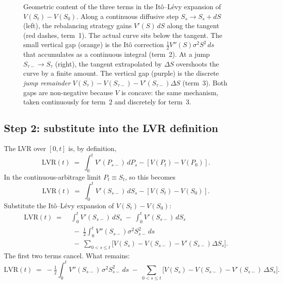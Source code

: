 \documentclass[11pt]{article}
\theoremstyle{definition}
\theoremstyle{remark}
\newcommand{\1}{\mathbf{1}}
\begin{document}
\begin{figure}[h]
\caption{Geometric content of the three terms in the Itô--Lévy expansion of $V(S_t) - V(S_0)$. Along a continuous diffusive step $S_s \to S_s + dS$ (left), the rebalancing strategy gains $V'(S)\,dS$ along the tangent (red dashes, term~1). The actual curve sits below the tangent. The small vertical gap (orange) is the Itô correction $\frac{1}{2}V''(S)\sigma^2 S^2\,ds$ that accumulates as a continuous integral (term~2). At a jump $S_{\tau-} \to S_\tau$ (right), the tangent extrapolated by $\Delta S$ overshoots the curve by a finite amount. The vertical gap (purple) is the discrete \emph{jump remainder} $V(S_\tau) - V(S_{\tau-}) - V'(S_{\tau-})\Delta S$ (term~3). Both gaps are non-negative because $V$ is concave: the same mechanism, taken continuously for term~2 and discretely for term~3.}
\label{fig:itolevy}
\end{figure}

\subsection{Step 2: substitute into the LVR definition}

The LVR over $[0, t]$ is, by definition,
\[
\mathrm{LVR}(t) \;=\; \int_0^t V'(P_{s-})\,dP_s - [V(P_t) - V(P_0)].
\]
In the continuous-arbitrage limit $P_t \equiv S_t$, so this becomes
\[
\mathrm{LVR}(t) \;=\; \int_0^t V'(S_{s-})\,dS_s - [V(S_t) - V(S_0)].
\]
Substitute the Itô–Lévy expansion of $V(S_t) - V(S_0)$:
\begin{align*}
\mathrm{LVR}(t) \;=\;& \int_0^t V'(S_{s-})\,dS_s \;-\; \int_0^t V'(S_{s-})\,dS_s \\
& \;-\; \tfrac{1}{2}\int_0^t V''(S_{s-})\sigma^2 S_{s-}^2\,ds \\
& \;-\; \sum_{0 < s \le t}\big[V(S_s) - V(S_{s-}) - V'(S_{s-})\Delta S_s\big].
\end{align*}
The first two terms cancel. What remains:
\begin{equation}\label{eq:lvr-decomp}
\mathrm{LVR}(t) \;=\; -\tfrac{1}{2}\int_0^t V''(S_{s-})\,\sigma^2 S_{s-}^2\,ds \;-\; \sum_{0 < s \le t}\!\Big[V(S_s) - V(S_{s-}) - V'(S_{s-})\,\Delta S_s\Big].
\end{equation}
\end{document}
